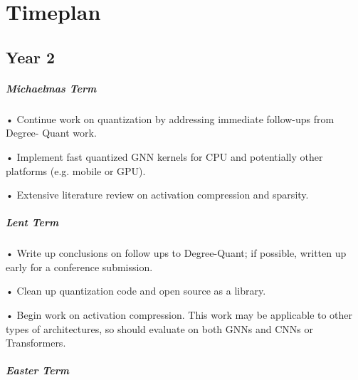 \documentclass[withindex,glossary,firstyr]{cam-thesis}
\begin{document}






\chapter{Timeplan} \label{Timeplan}

\section{Year 2}
\paragraph{Michaelmas Term} 

• Continue work on quantization by addressing immediate follow-ups from Degree- Quant work.

• Implement fast quantized GNN kernels for CPU and potentially other platforms (e.g. mobile or GPU).

• Extensive literature review on activation compression and sparsity. 
\paragraph{Lent Term} 

• Write up conclusions on follow ups to Degree-Quant; if possible, written up early for a conference submission.

• Clean up quantization code and open source as a library.

• Begin work on activation compression. This work may be applicable to other types of architectures, so should evaluate on both GNNs and CNNs or Transformers.
\paragraph{Easter Term}
\end{document}
